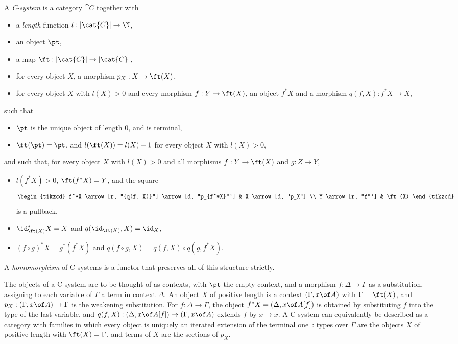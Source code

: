 \begin{definition}\label{def:c-system}
    A \emph{C-system} is a category $\cat{C}$ together with
    \begin{itemize}
        \item a \emph{length} function $l : \left|\cat{C}\right| \to \N$,
        \item an object $\pt$,
        \item a map $\ft : \left|\cat{C}\right| \to \left|\cat{C}\right|$,
        \item for every object $X$, a morphism $p_X : X \to \ft(X)$,
        \item for every object $X$ with $l(X) > 0$ and every morphism $f : Y \to \ft(X)$, an object $f^*X$ and a morphism $q(f, X) : f^*X \to X$,
    \end{itemize}
    such that
    \begin{itemize}
        \item $\pt$ is the unique object of length $0$, and is terminal,
        \item $\ft(\pt) = \pt$, and $l(\ft(X)) = l(X) - 1$ for every object $X$ with $l(X) > 0$,
    \end{itemize}
    and such that, for every object $X$ with $l(X) > 0$ and all morphisms $f : Y \to \ft(X)$ and $g : Z \to Y$,
    \begin{itemize}
        \item $l(f^*X) > 0$, $\ft(f^*X) = Y$, and the square
        \[
        \begin{tikzcd}
            f^*X \arrow[r, "{q(f, X)}"] \arrow[d, "p_{f^*X}"'] & X \arrow[d, "p_X"] \\
            Y \arrow[r, "f"'] & \ft(X)
        \end{tikzcd}
        \]
        is a pullback,
        \item $\id_{\ft(X)}^*X = X$ and $q(\id_{\ft(X)}, X) = \id_X$,
        \item $(f \circ g)^*X = g^*(f^*X)$ and $q(f \circ g, X) = q(f, X) \circ q(g, f^*X)$.
    \end{itemize}
    A \emph{homomorphism} of C-systems is a functor that preserves all of this structure strictly.
\end{definition}

The objects of a C-system are to be thought of as contexts, with $\pt$ the empty context, and a morphism $f : \Delta \to \Gamma$ as a substitution, assigning to each variable of $\Gamma$ a term in context $\Delta$. An object $X$ of positive length is a context $(\Gamma, x \of A)$ with $\Gamma = \ft(X)$, and $p_X : (\Gamma, x \of A) \to \Gamma$ is the weakening substitution. For $f : \Delta \to \Gamma$, the object $f^*X = (\Delta, x \of A[f])$ is obtained by substituting $f$ into the type of the last variable, and $q(f, X) : (\Delta, x \of A[f]) \to (\Gamma, x \of A)$ extends $f$ by $x \mapsto x$. A C-system can equivalently be described as a category with families in which every object is uniquely an iterated extension of the terminal one~\cite[Props.~41 and~45]{AhrensLumsdaineNorth2024}: types over $\Gamma$ are the objects $X$ of positive length with $\ft(X) = \Gamma$, and terms of $X$ are the sections of $p_X$.

